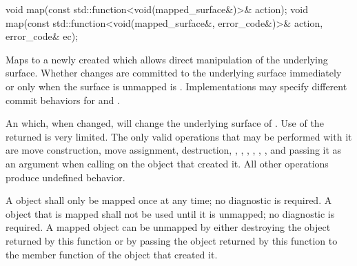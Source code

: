 \begin{itemdecl}
void map(const std::function<void(mapped_surface&)>& action);
void map(const std::function<void(mapped_surface&, error_code&)>& action, error_code& ec);
\end{itemdecl}
\begin{itemdescr}
	\pnum
	\effects
	Maps  to a newly created  which allows direct manipulation of the underlying surface. Whether changes are committed to the underlying surface immediately or only when the surface is unmapped is . Implementations may specify different commit behaviors for  and .
	
	\pnum
	\returns
	An  which, when changed, will change the underlying surface of .
	\enternote
	Use of the returned  is very limited. The only valid operations that may be performed with it are move construction, move assignment, destruction, , , , , , , and passing it as an argument when calling  on the  object that created it. All other operations produce undefined behavior.
	\exitnote
	
	\pnum
	\remarks
	A  object shall only be mapped once at any time; no diagnostic is required. A  object that is mapped shall not be used until it is unmapped; no diagnostic is required. A mapped  object can be unmapped by either destroying the  object returned by this function or by passing the  object returned by this function to the  member function of the  object that created it.
\end{itemdescr}

